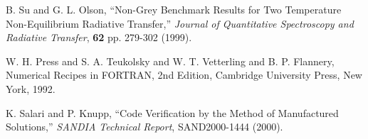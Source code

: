 \documentclass[final,3p,times]{elsarticle}
\begin{document}
\begin{thebibliography}{300}
 B. Su and G. L. Olson, ``Non-Grey Benchmark Results for Two Temperature Non-Equilibrium Radiative Transfer,'' {\em Journal of Quantitative Spectroscopy and Radiative Transfer}, {\bf 62} pp. 279-302 (1999).

 W. H. Press and S. A. Teukolsky and W. T. Vetterling and B. P. Flannery, Numerical Recipes in FORTRAN, 2nd Edition, Cambridge University Press, New York, 1992.

 K. Salari and P. Knupp, ``Code Verification by the Method of Manufactured Solutions,'' {\it SANDIA Technical Report}, SAND2000-1444 (2000).

\end{thebibliography} 
\end{document}
